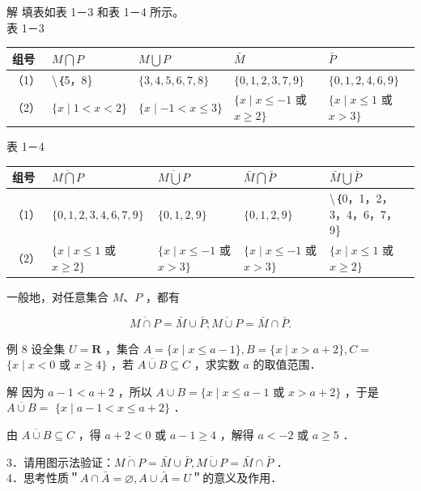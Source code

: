 \documentclass[10pt]{article}
\begin{document}
解 填表如表 1－3 和表 1－4 所示。\\
表 1－3

\begin{center}
\begin{tabular}{|l|l|l|l|l|}
\hline
组号 & \(M \bigcap P\) & \(M \bigcup P\) & \(\bar{M}\) & \(\bar{P}\) \\
\hline
（1） & \textbackslash ｛5，8\} & \(\{3,4,5,6,7,8\}\) & \(\{0,1,2,3,7,9\}\) & \(\{0,1,2,4,6,9\}\) \\
\hline
（2） & \(\{x \mid 1<x<2\}\) & \(\{x \mid-1<x \leqslant 3\}\) & \(\{x \mid x \leqslant-1\) 或 \(x \geqslant 2\}\) & \(\{x \mid x \leqslant 1\) 或 \(x>3\}\) \\
\hline
\end{tabular}
\end{center}

表 1－4

\begin{center}
\begin{tabular}{|l|l|l|l|l|}
\hline
组号 & \(\overline{M \bigcap P}\) & \(\overline{M \bigcup P}\) & \(\bar{M} \bigcap \bar{P}\) & \(\bar{M} \bigcup \bar{P}\) \\
\hline
（1） & \(\{0,1,2,3,4,6,7,9\}\) & \(\{0,1,2,9\}\) & \(\{0,1,2,9\}\) & \textbackslash ｛0，1，2，3，4，6，7，9\} \\
\hline
（2） & \(\{x \mid x \leqslant 1\) 或 \(x \geqslant 2\}\) & \(\{x \mid x \leqslant-1\) 或 \(x>3\}\) & \(\{x \mid x \leqslant-1\) 或 \(x>3\}\) & \(\{x \mid x \leqslant 1\) 或 \(x \geqslant 2\}\) \\
\hline
\end{tabular}
\end{center}

一般地，对任意集合 \(M 、 P\) ，都有

\[
\overline{M \cap P}=\bar{M} \cup \bar{P} ; \overline{M \cup P}=\bar{M} \cap \bar{P} .
\]

例 8 设全集 \(U=\mathbf{R}\) ，集合 \(A=\{x \mid x \leqslant a-1\}, B=\{x \mid x>a+2\}, C=\) \(\{x \mid x<0\) 或 \(x \geqslant 4\}\) ，若 \(\overline{A \cup B} \subseteq C\) ，求实数 \(a\) 的取值范围．

解 因为 \(a-1<a+2\) ，所以 \(A \cup B=\{x \mid x \leqslant a-1\) 或 \(x>a+2\}\) ，于是 \(\overline{A \cup B}=\) \(\{x \mid a-1<x \leqslant a+2\}\) ．

由 \(\overline{A \cup B} \subseteq C\) ，得 \(a+2<0\) 或 \(a-1 \geqslant 4\) ，解得 \(a<-2\) 或 \(a \geqslant 5\) ．

3．请用图示法验证：\(\overline{M \cap P}=\bar{M} \cup \bar{P}, \overline{M \cup P}=\bar{M} \cap \bar{P}\) ．\\
4．思考性质＂\(A \cap \bar{A}=\varnothing, A \cup \bar{A}=U\)＂的意义及作用．
\end{document}
